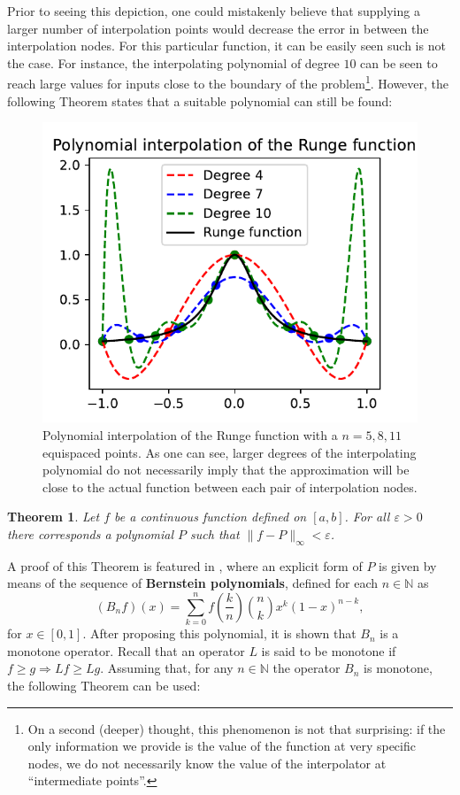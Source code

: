\documentclass[12pt]{report} %
\newtheorem{theorem}{Theorem}
\begin{document}
Prior to seeing this depiction, one could mistakenly believe that supplying a larger number of interpolation points would decrease the error in between the interpolation nodes. For this particular function, it can be easily seen such is not the case. For instance, the interpolating polynomial of degree $10$ can be seen to reach large values for inputs close to the boundary of the problem\footnote{On a second (deeper) thought, this phenomenon is not that surprising: if the only information we provide is the value of the function at very specific nodes, we do not necessarily know the value of the interpolator at ``intermediate points''.}. However, the following Theorem states that a suitable polynomial can still be found:

\begin{figure}[ht]
    \centering
    \includegraphics[width=.55\textwidth]{imagenes/polynomial_interpolation/Runge_Polynomial_interpolation.pdf}
    \caption{Polynomial interpolation of the Runge function with a $n=5,8,11$ equispaced points. As one can see, larger degrees of the interpolating polynomial do not necessarily imply that the approximation will be close to the actual function between each pair of interpolation nodes.}
    \label{fig:runge-polynomial-interpolation}
\end{figure}

\begin{theorem}
  \label{thm-polynomial-convergence}Let $f$ be a continuous function defined
  on $[a, b]$. For all $\varepsilon > 0$ there corresponds a polynomial $P$
  such that $\| f - P \|_{\infty} < \varepsilon$.
\end{theorem}

A proof of this Theorem is featured in \cite{cheney1966introduction}, where an explicit form of $P$ is given by means of the sequence of
\textbf{Bernstein polynomials}, defined for each $n \in \mathbb{N}$ as
\begin{equation}
  (B_n f) (x) = \sum_{k = 0}^n f \left( \frac{k}{n} \right) \binom{n}{k} x^k
  (1 - x)^{n - k} \label{eqn-bernstein-polynomial},
\end{equation}
for $x \in [0, 1]$. After proposing this polynomial, it is shown that $B_n$ is
a monotone operator. Recall that an operator $L$ is said to be monotone if $f
\geq g \Rightarrow L f \geq L g$. Assuming that, for any $n\in \mathbb{N}$ the operator $B_n$ is monotone, the following Theorem can be
used:
\end{document}
